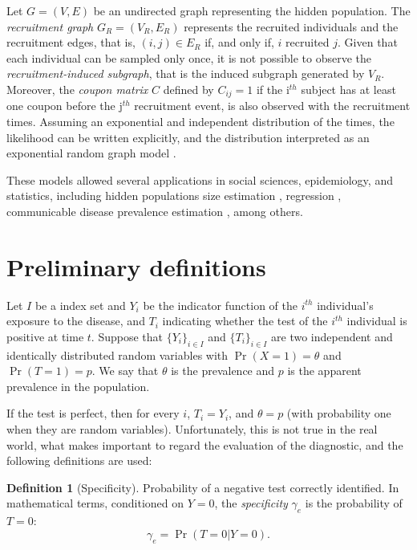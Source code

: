 \documentclass[a4paper, notitlepage, 11pt]{article}
\theoremstyle{definition}
\newtheorem{definition}{Definition}[section]
\theoremstyle{remark}
\begin{document}
Let $G = (V,E)$ be an undirected graph representing the hidden population. The {\em recruitment graph} $G_R =
(V_R, E_R)$ represents the recruited individuals and the recruitment edges,
that is, $(i,j) \in E_R$ if, and only if, $i$ recruited $j$.
Given that each individual can be sampled only once, it is not possible to
observe the {\em recruitment-induced subgraph}, that is the induced subgraph
generated by $V_R$. Moreover, the {\em coupon matrix} $C$ defined by $C_{ij} =
1$ if the i$^{th}$ subject has at least one coupon before the j$^{th}$
recruitment event, is also observed with the recruitment times. Assuming an
exponential and independent distribution of the times, the likelihood can be
written explicitly, and the distribution interpreted as an exponential random graph
model \cite[]{crawford2016}.  

These models allowed several applications in social sciences, epidemiology,
and statistics, including hidden populations size estimation
\cite[]{crawford2018hidden}, regression \cite[]{bastos2012binary}, communicable
disease prevalence estimation \cite[]{albuquerque2009avaliaccao}, among others.

\section{Preliminary definitions}

Let $I$ be a index set and $Y_i$ be the indicator function of the $i^{th}$ individual's exposure to the disease, and $T_i$
indicating whether the test of the $i^{th}$ individual is positive at time
$t$. Suppose that $\{Y_i\}_{i \in I}$ and $\{T_i\}_{i \in I}$ are two independent and identically distributed
random variables with $\Pr(X = 1) = \theta$ and $\Pr(T = 1) = p$. We say that
$\theta$ is the prevalence and $p$ is the apparent prevalence in the
population. 

If the test is perfect, then for every $i$, $T_i = Y_i$, and
$\theta = p$ (with probability one when they are random variables).
Unfortunately, this is not true in the real world, what makes important to
regard the evaluation of the diagnostic, and the following definitions are used:

\begin{definition}[Specificity]
  Probability of a negative test correctly identified. In mathematical terms,
  conditioned on $Y = 0$, the {\em specificity} $\gamma_e$ is the probability of $T = 0$: 
  \begin{equation}
    \gamma_e = \Pr(T = 0|Y = 0). 
  \end{equation} 
\end{definition}
\end{document}
